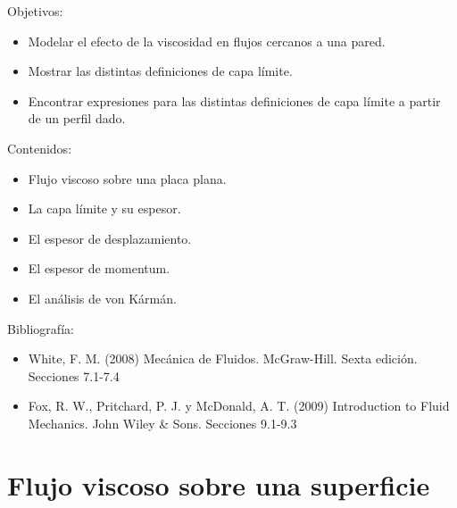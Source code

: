 \begin{framed}

Objetivos:
\begin{itemize}
    \item Modelar el efecto de la viscosidad en flujos cercanos a una pared.
    \item Mostrar las distintas definiciones de capa límite.
    \item Encontrar expresiones para las distintas definiciones de capa límite a partir de un perfil dado. 
\end{itemize}

Contenidos:
\begin{itemize}
    \item Flujo viscoso sobre una placa plana.
    \item La capa límite y su espesor.
    \item El espesor de desplazamiento.
    \item El espesor de momentum.
    \item El análisis de von Kármán.
\end{itemize}

Bibliografía:
\begin{itemize}
    \item White, F. M. (2008) Mecánica de Fluidos. McGraw-Hill. Sexta edición. Secciones 7.1-7.4
    \item Fox, R. W., Pritchard, P. J. y McDonald, A. T. (2009) Introduction to Fluid Mechanics. John Wiley \& Sons. Secciones 9.1-9.3
\end{itemize}
\end{framed}

\section*{Flujo viscoso sobre una superficie}

